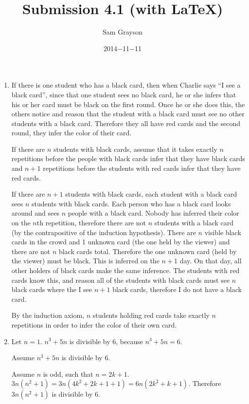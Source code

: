 \documentclass[12pt,letterpaper]{article}
\title{Submission 4.1 (with \LaTeX)}
\date{2014$-$11$-$11}
\author{Sam Grayson}
\begin{document}
\maketitle
\singlespacing

\begin{enumerate}

\item {If there is one student who has a black card, then when Charlie says ``I see a black card'', since that one student sees no black card, he or she infers that his or her card must be black on the first round. Once he or she does this, the others notice and reason that the student with a black card must see no other students with a black card. Therefore they all have red cards and the second round, they infer the color of their card.

If there are $n$ students with black cards, assume that it takes exactly $n$ repetitions before the people with black cards infer that they have black cards and $n + 1$ repetitions before the students with red cards infer that they have red cards.

If there are $n + 1$ students with black cards, each student with a black card sees $n$ students with black cards. Each person who has a black card looks around and sees $n$ people with a black card. Nobody has inferred their color on the $n$th repetition, therefore there are not $n$ students with a black card (by the contrapositive of the induction hypothesis). There are $n$ visible black cards in the crowd and 1 unknown card (the one held by the viewer) and there are not $n$ black cards total. Therefore the one unknown card (held by the viewer) must be black. This is inferred on the $n+1$ day. On that day, all other holders of black cards make the same inference. The students with red cards know this, and reason all of the students with black cards must see $n$ black cards where the I see $n+1$ black cards, therefore I do not have a black card.

By the induction axiom, $n$ students holding red cards take exactly $n$ repetitions in order to infer the color of their own card.}

\item {Let $n = 1$. $n^3 + 5n$ is divisible by $6$, because $n^3 + 5n = 6$.

Assume $n^3 + 5n$ is divisible by $6$.

Assume $n$ is odd, such that $n = 2k+1$. $3n(n^2 + 1) = 3n(4k^2 + 2k + 1 + 1) = 6n(2k^2 + k + 1)$. Therefore $3n(n^2 + 1)$ is divisible by $6$.

}
\end{enumerate}
\end{document}
